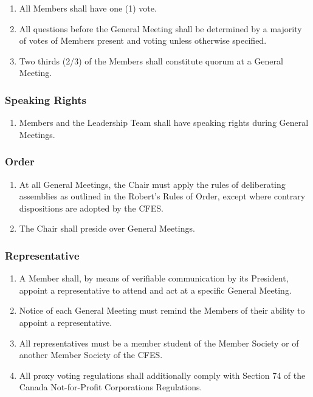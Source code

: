 \begin{enumerate}
 \item All Members shall have one (1) vote.
 \item All questions before the General Meeting shall be determined by a majority of votes of Members present and voting unless otherwise specified.
 \item Two thirds (2/3) of the Members shall constitute quorum at a General Meeting.
\end{enumerate}

\subsubsection{Speaking Rights}
\label{meeting-guidelines-speaking-rights}

\begin{enumerate}
 \item Members and the Leadership Team shall have speaking rights during General Meetings.
\end{enumerate}

\subsubsection{Order}
\label{meeting-guidelines-order}

\begin{enumerate}
 \item At all General Meetings, the Chair must apply the rules of deliberating assemblies as outlined in the Robert’s Rules of Order, except where contrary dispositions are adopted by the CFES.
 \item The Chair shall preside over General Meetings.
\end{enumerate}

\subsubsection{Representative}
\label{meeting-guidelines-representative}

\begin{enumerate}
 \item A Member shall, by means of verifiable communication by its President, appoint a representative to attend and act at a specific General Meeting.
 \item Notice of each General Meeting must remind the Members of their ability to appoint a representative.
 \item All representatives must be a member student of the Member Society or of another Member Society of the CFES.
 \item All proxy voting regulations shall additionally comply with Section 74 of the Canada Not-for-Profit Corporations Regulations.
\end{enumerate}

